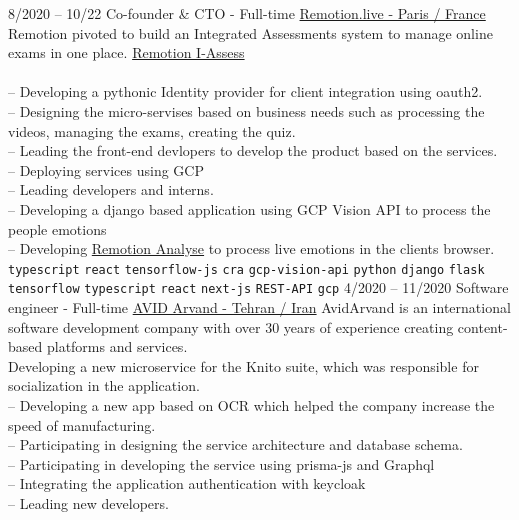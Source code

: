 \documentclass[9pt]{developercv}
\begin{document}
\begin{entrylist}
{	}
	\entry
	{8/2020 -- 10/22}
	{Co-founder \& CTO - Full-time}
	{\href{https://remotion.live/}{Remotion.live - Paris / France }}
	{Remotion pivoted to build an Integrated Assessments system to manage online exams in one place.
		\href{https://remotion.live/} {Remotion I-Assess} \\\\
		-- Developing a pythonic Identity provider for client integration using oauth2. \\
		-- Designing the micro-servises based on business needs such as processing the videos, managing the exams, creating the quiz. \\
		-- Leading the front-end devlopers to develop the product based on the services. \\
		-- Deploying services using GCP \\
		-- Leading developers and interns. \\
		-- Developing a django based application using GCP Vision API to process the people emotions \\
		-- Developing \href{https://analyse.remotion.live/} {Remotion Analyse} to process live emotions in the clients browser. \\
		\texttt{typescript}\slashsep
		\texttt{react}\slashsep
		\texttt{tensorflow-js}\slashsep
		\texttt{cra}\slashsep
		\texttt{gcp-vision-api}\slashsep
		\texttt{python}\slashsep
		\texttt{django}\slashsep
		\texttt{flask}\slashsep
		\texttt{tensorflow}\slashsep
		\texttt{typescript}\slashsep
		\texttt{react}\slashsep
		\texttt{next-js}\slashsep
		\texttt{REST-API}\slashsep
		\texttt{gcp}\slashsep
	}
	\entry
	{4/2020 -- 11/2020}
	{Software engineer - Full-time}
	{
		\href{https://www.linkedin.com/company/avid-technology-development/}{AVID Arvand - Tehran / Iran}}
	{
		AvidArvand is an international software development company with over 30 years of experience creating content-based platforms and services. \\
		Developing a new microservice for the Knito suite, which was responsible for socialization in the application.\\
		-- Developing a new app based on OCR which helped
		the company increase the speed of manufacturing. \\
		-- Participating in designing the service architecture and database schema. \\
		-- Participating in developing the service using prisma-js and Graphql \\
		-- Integrating the application authentication with keycloak \\
		-- Leading new developers. \\
		
}
\end{entrylist}
\end{document}
